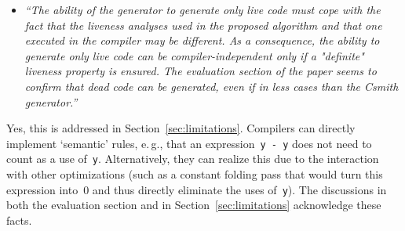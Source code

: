 \documentclass{llncs}
\begin{document}
\begin{itemize}\item
\emph{``The ability of the generator to generate only live code must
cope with the fact that the liveness analyses used in the proposed algorithm
and that one executed in the compiler may be different. As a consequence,
the ability to generate only live code can be compiler-independent only if a
"definite" liveness property is ensured. The evaluation section of the paper
seems to confirm that dead code can be generated, even if in less cases than
the Csmith generator.''}
\end{itemize}

Yes, this is addressed in Section~\ref{sec:limitations}. Compilers can
directly implement `semantic' rules, e.\,g., that an expression~\texttt{y -
y} does not need to count as a use of~\texttt{y}. Alternatively, they can
realize this due to the interaction with other optimizations (such as a
constant folding pass that would turn this expression into~0 and thus
directly eliminate the uses of~\texttt{y}). The discussions in both the
evaluation section and in Section~\ref{sec:limitations} acknowledge these
facts.
\end{document}
